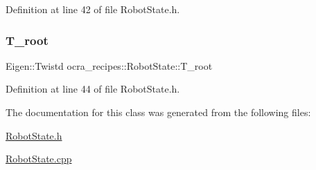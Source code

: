 Definition at line 42 of file Robot\+State.\+h.

\hypertarget{classocra__recipes_1_1RobotState_ae71e2d5ff8976c859921e06a4f35bf25}{}\label{classocra__recipes_1_1RobotState_ae71e2d5ff8976c859921e06a4f35bf25} 
\subsubsection{\texorpdfstring{T\+\_\+root}{T\_root}}
{\footnotesize\ttfamily Eigen\+::\+Twistd ocra\+\_\+recipes\+::\+Robot\+State\+::\+T\+\_\+root}



Definition at line 44 of file Robot\+State.\+h.



The documentation for this class was generated from the following files\+:\begin{DoxyCompactItemize}
\item 
\hyperlink{RobotState_8h}{Robot\+State.\+h}\item 
\hyperlink{RobotState_8cpp}{Robot\+State.\+cpp}\end{DoxyCompactItemize}
